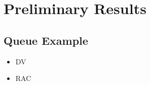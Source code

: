 
%

\chapter{Preliminary Results}
\label{cha:preliminary_results}

\section{Queue Example}
\label{sec:queue_example}

\begin{itemize}
    \item DV
    \item RAC
\end{itemize}
